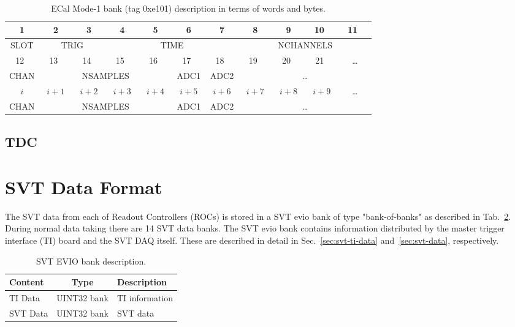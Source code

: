 \documentclass{desyproc}
\begin{document}
\begin{table}[h]
  \begin{center}
      \caption{ECal Mode-1 bank (tag 0xe101) description in terms of words and bytes.}
    \label{tab:ecal-fadcMode1}
    \begin{tabular}{|c|c|c|c|c|c|c|c|c|c|c|}
   	\hline
        \hline
        \ \ 1\ \  &\ \ 2\ \  &\ \ 3\ \  &\ \ 4\ \  &\ \ 5\ \  &\ \ 6\ \  &\ \ 7\ \  &\ \ 8\ \  &\ \ 9\ \  &\ 10\ \  &\ 11\ \  \\
        \hline
        SLOT & \multicolumn{2}{c}{TRIG} & \multicolumn{4}{|c}{TIME} & \multicolumn{4}{|c|}{NCHANNELS} \\
        \hline
        \hline
        \ 12\ \  &\ 13\ \  &\ 14\ \  &\ 15\ \  &\ 16\ \  &\ 17\ \  &\ 18\ \  &\ 19\ \  &\ 20\ \  &\ 21\ \  &\ldots \\
        \hline
        CHAN & \multicolumn{4}{c|}{NSAMPLES} & ADC1 & ADC2 & \multicolumn{4}{c|}{\ldots} \\
        \hline
        \hline
        $i$&$i+1$&$i+2$&$i+3$&$i+4$&$i+5$&$i+6$&$i+7$&$i+8$&$i+9$&\ldots \\
        \hline
        CHAN & \multicolumn{4}{c|}{NSAMPLES} & ADC1 & ADC2 & \multicolumn{4}{c|}{\ldots} \\
        \hline
        \hline
      \end{tabular}
  \end{center}
\end{table}

\subsection{TDC}

\section{SVT Data Format}

The SVT data from each of Readout Controllers (ROCs) is stored in a SVT evio bank of type "bank-of-banks" as 
described in Tab.~\ref{tab:svt-bank}. During normal data taking there are 14 SVT data banks. The SVT evio bank 
contains information distributed by the master trigger interface (TI) board and the SVT DAQ itself. These are described in 
detail in Sec.~\ref{sec:svt-ti-data} and~\ref{sec:svt-data}, respectively.

\begin{table}[]
  \begin{center}
    \caption{SVT EVIO bank description.}
    \label{tab:svt-bank}
    \begin{tabular}{|l|c|l|}
    \hline
    \bf Content & \bf Type & \bf Description\\
      \hline
      TI Data & UINT32 bank & TI information\\
      \hline
      SVT Data & UINT32 bank & SVT data\\
      \hline
      \end{tabular}
  \end{center}
\end{table}
\end{document}
